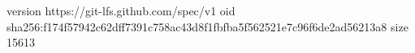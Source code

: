 version https://git-lfs.github.com/spec/v1
oid sha256:f174f57942c62dff7391c758ac43d8f1fbfba5f562521e7c96f6de2ad56213a8
size 15613
